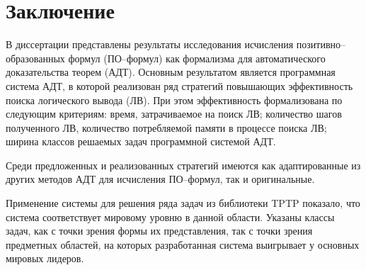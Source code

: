 \chapter*{Заключение}

В диссертации представлены результаты исследования исчисления позитивно--образованных формул (ПО--формул) как формализма для автоматического доказательства теорем (АДТ). Основным результатом является программная система АДТ, в которой реализован ряд стратегий повышающих эффективность поиска логического вывода (ЛВ). При этом эффективность формализована по следующим критериям: время, затрачиваемое на поиск ЛВ; количество шагов полученного ЛВ, количество потребляемой памяти в процессе поиска ЛВ; ширина классов решаемых задач программной системой АДТ.

Среди предложенных и реализованных стратегий имеются как адаптированные из других методов АДТ для исчисления ПО--формул, так и оригинальные.

Применение системы для решения ряда задач из библиотеки TPTP показало, что система соответствует мировому уровню в данной области. Указаны классы задач, как с точки зрения формы их представления, так с точки зрения предметных областей, на которых разработанная система выигрывает у основных мировых лидеров. %



